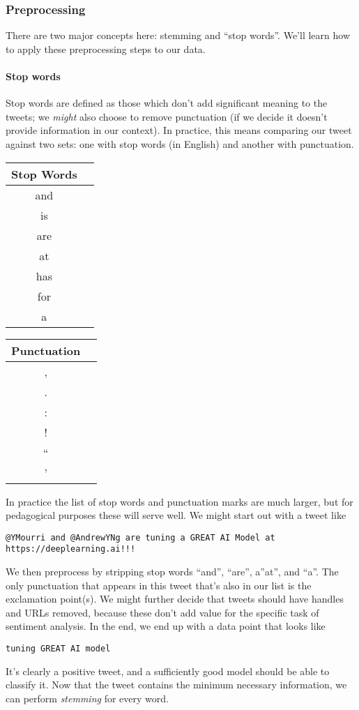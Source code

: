 \documentclass[12pt]{article}
\begin{document}
\subsubsection{Preprocessing} There are two major concepts here: stemming and ``stop words''.
We'll learn how to apply these preprocessing steps to our data.
\paragraph{Stop words}
Stop words are defined as those which don't add significant meaning to the tweets; we \emph{might} also choose to remove punctuation (if we decide it doesn't provide information in our context). In practice, this means comparing our tweet against two sets: one with stop words (in English) and another with punctuation. 

\begin{minipage}{1.0\textwidth}
  \begin{multicols}{2}
      \begin{tabular}{c c}
        \hline
        Stop Words \\
        \hline
        and \\
        is \\
        are \\
        at \\
        has \\
        for \\
        a \\
      \end{tabular}
    \vfill\null \columnbreak  
    \begin{tabular}{c c}
      \hline
      Punctuation \\
      \hline
      , \\
      . \\
      : \\
      ! \\
      `` \\
      ' \\
    \end{tabular}
\end{multicols}
\end{minipage}
In practice the list of stop words and punctuation marks are much larger, but for pedagogical purposes these will serve well.
We might start out with a tweet like
\begin{verbatim}
@YMourri and @AndrewYNg are tuning a GREAT AI Model at https://deeplearning.ai!!!
\end{verbatim}
We then preprocess by stripping stop words ``and'', ``are'', a''at'', and ``a''. The only punctuation that appears in this tweet that's also in our list is the exclamation point(s). We might further decide that tweets should have handles and URLs removed, because these don't add value for the specific task of sentiment analysis. In the end, we end up with a data point that looks like
\begin{verbatim}
tuning GREAT AI model
\end{verbatim}
It's clearly a positive tweet, and a sufficiently good model should be able to classify it. Now that the tweet contains the minimum necessary information, we can perform \emph{stemming} for every word.
\end{document}
